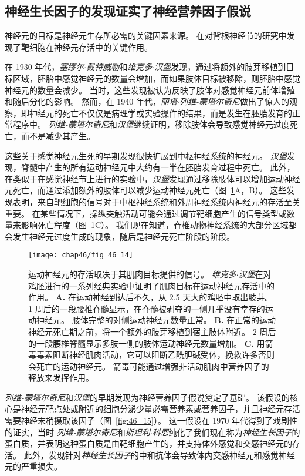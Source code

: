 \subsection{神经生长因子的发现证实了神经营养因子假说}

神经元的目标是神经元生存所必需的关键因素来源。
在对背根神经节的研究中发现了靶细胞在神经元存活中的关键作用。


在 1930 年代，\textit{塞缪尔$\cdot$戴特威勒}和\textit{维克多$\cdot$汉堡}发现，通过将额外的肢芽移植到目标区域，胚胎中感觉神经元的数量会增加，而如果肢体目标被移除，则胚胎中感觉神经元的数量会减少。 
当时，这些发现被认为反映了肢体对感觉神经元前体增殖和随后分化的影响。
然而，在 1940 年代，\textit{丽塔$\cdot$列维-蒙塔尔奇尼}做出了惊人的观察，即神经元的死亡不仅仅是病理学或实验操作的结果，而是发生在胚胎发育的正常程序中。
\textit{列维-蒙塔尔奇尼}和\textit{汉堡}继续证明，移除肢体会导致感觉神经元过度死亡，而不是减少其产生。


这些关于感觉神经元生死的早期发现很快扩展到中枢神经系统的神经元。
\textit{汉堡}发现，脊髓中产生的所有运动神经元中大约有一半在胚胎发育过程中死亡。 
此外，在类似于在感觉神经节上进行的实验中，\textit{汉堡}发现通过移除肢体可以增加运动神经元死亡，而通过添加额外的肢体可以减少运动神经元死亡（图~\ref{fig:46_14}A，B）。
这些发现表明，来自靶细胞的信号对于中枢神经系统和外周神经系统内神经元的存活至关重要。
在某些情况下，操纵突触活动可能会通过调节靶细胞产生的信号类型或数量来影响死亡程度（图~\ref{fig:46_14}C）。
我们现在知道，脊椎动物神经系统的大部分区域都会发生神经元过度生成的现象，随后是神经元死亡阶段的阶段。


\begin{figure}[htbp]
	\centering
	\texttt{[image: chap46/fig\_46\_14]}
	\caption{运动神经元的存活取决于其肌肉目标提供的信号。
		\textit{维克多$\cdot$汉堡}在对鸡胚进行的一系列经典实验中证明了肌肉目标在运动神经元存活中的作用\cite{purves1985principles}。
		\textbf{A.} 在运动神经到达后不久，从 2.5 天大的鸡胚中取出肢芽。
		1 周后的一段腰椎脊髓显示，在脊髓被剥夺的一侧几乎没有幸存的运动神经元。
		肢体完整的对侧运动神经元数量正常。
		\textbf{B.} 在正常的运动神经元死亡期之前，将一个额外的肢芽移植到宿主肢体附近。
		2 周后的一段腰椎脊髓显示多肢一侧的肢体运动神经元数量增加。
		\textbf{C.} 用箭毒毒素阻断神经肌肉活动，它可以阻断乙酰胆碱受体，挽救许多否则会死亡的运动神经元。
		箭毒可能通过增强非活动肌肉中营养因子的释放来发挥作用。}
	\label{fig:46_14}
\end{figure}


\textit{列维-蒙塔尔奇尼}和\textit{汉堡}的早期发现为神经营养因子假说奠定了基础。
该假设的核心是神经元靶点处或附近的细胞分泌少量必需营养素或营养因子，并且神经元存活需要神经末梢摄取该因子（图~\ref{fig:46_15}）。
这一假设在 1970 年代得到了戏剧性的证实，当时 \textit{列维-蒙塔尔奇尼}和\textit{斯坦利$\cdot$科恩}纯化了我们现在称为\textit{神经生长因子}的蛋白质，并表明这种蛋白质是由靶细胞产生的，并支持体外感觉和交感神经元的存活。
此外，发现针对\textit{神经生长因子}的中和抗体会导致体内交感神经元和感觉神经元的严重损失。


